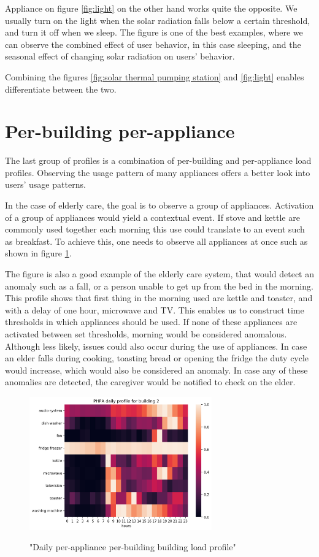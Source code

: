 Appliance on figure \ref{fig:light} on the other hand works quite the opposite.
We usually turn on the light when the solar radiation falls below a certain threshold, and turn it off when we sleep.
The figure is one of the best examples, where we can observe the combined effect of user behavior, in this case sleeping, and the seasonal effect of changing solar radiation on users' behavior. 

Combining the figures \ref{fig:solar thermal pumping station} and \ref{fig:light} enables differentiate between the two. 

\section{Per-building per-appliance}

The last group of profiles is a combination of per-building and per-appliance load profiles.
Observing the usage pattern of many appliances offers a better look into users' usage patterns.

In the case of elderly care, the goal is to observe a group of appliances.
Activation of a group of appliances would yield a contextual event.
If stove and kettle are commonly used together each morning this use could translate to an event such as breakfast. 
To achieve this, one needs to observe all appliances at once such as shown in figure \ref{fig:PHPA}.

The figure is also a good example of the elderly care system, that would detect an anomaly such as a fall, or a person unable to get up from the bed in the morning.
This profile shows that first thing in the morning used are kettle and toaster, and with a delay of one hour, microwave and TV. 
This enables us to construct time thresholds in which appliances should be used.
If none of these appliances are activated between set thresholds, morning would be considered anomalous.
Although less likely, issues could also occur during the use of appliances. 
In case an elder falls during cooking, toasting bread or opening the fridge the duty cycle would increase, which would also be considered an anomaly.
In case any of these anomalies are detected, the caregiver would be notified to check on the elder. 

\begin{figure}[H]
	\centering
	\caption{"Daily per-appliance per-building building load profile"}
	\includegraphics[width=0.7\textwidth]{../Figures/LPS/PHPA.png}
	\label{fig:PHPA}
\end{figure}

